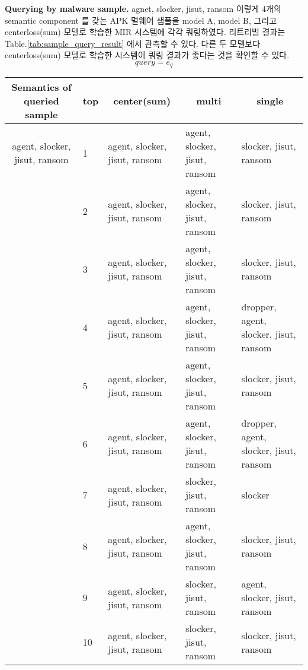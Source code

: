 \textbf{Querying by malware sample. }
agnet, slocker, jisut, ransom 이렇게 4개의 semantic component 를 갖는 APK 멀웨어 샘플을 model A, model B, 그리고 centerloss(sum) 모델로 학습한 MIR 시스템에 각각 쿼링하였다. 리트리벌 결과는 Table.\ref{tab:sample_query_result} 에서 관측할 수 있다. 다른 두 모델보다 centerloss(sum) 모델로 학습한 시스템이 쿼링 결과가 좋다는 것을 확인할 수 있다. 
\[
   query = e_q 
\]


\begin{table*}%
\caption{Queyring by sample}
\label{tab:sample_query_result}
\begin{minipage}{\textwidth}
\begin{center}
\begin{tabular}{@{}lllll@{}}
\toprule
\multicolumn{1}{c}{Semantics of queried sample}   & top & \multicolumn{1}{c}{center(sum)} & \multicolumn{1}{c}{multi}     & \multicolumn{1}{c}{single}             \\ \midrule
\multicolumn{1}{c}{agent, slocker, jisut, ransom} & 1   & agent, slocker, jisut, ransom  & agent, slocker, jisut, ransom & slocker, jisut, ransom                 \\
                                                  & 2   & agent, slocker, jisut, ransom  & agent, slocker, jisut, ransom & slocker, jisut, ransom                 \\
                                                  & 3   & agent, slocker, jisut, ransom  & agent, slocker, jisut, ransom & slocker, jisut, ransom                 \\
                                                  & 4   & agent, slocker, jisut, ransom  & agent, slocker, jisut, ransom & dropper, agent, slocker, jisut, ransom \\
                                                  & 5   & agent, slocker, jisut, ransom  & agent, slocker, jisut, ransom & slocker, jisut, ransom                 \\
                                                  & 6   & agent, slocker, jisut, ransom  & agent, slocker, jisut, ransom & dropper, agent, slocker, jisut, ransom \\
                                                  & 7   & agent, slocker, jisut, ransom  & slocker, jisut, ransom        & slocker                                \\
                                                  & 8   & agent, slocker, jisut, ransom  & agent, slocker, jisut, ransom & slocker, jisut, ransom                 \\
                                                  & 9   & agent, slocker, jisut, ransom  & slocker, jisut, ransom        & agent, slocker, jisut, ransom          \\
                                                  & 10  & agent, slocker, jisut, ransom  & slocker, jisut, ransom        & slocker, jisut, ransom                 \\ \bottomrule
\end{tabular}
\end{center}
\bigskip\centering
\end{minipage}
\end{table*}%


